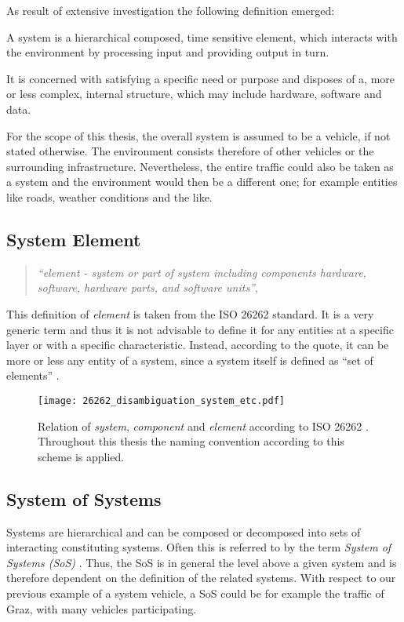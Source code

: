 As result of extensive investigation the following definition emerged:

\begin{myquote}
A system is a hierarchical composed, time sensitive element, which interacts with the environment by processing input and providing output in turn.

It is concerned with satisfying a specific need or purpose and disposes of a, more or less complex, internal structure, which may include hardware, software and data.
\end{myquote}

For the scope of this thesis, the overall system is assumed to be a vehicle, if not stated otherwise. The environment consists therefore of other vehicles or the surrounding infrastructure. Nevertheless, the entire traffic could also be taken as a system and the environment would then be a different one; for example entities like roads, weather conditions and the like.



\subsection{System Element}
\label{sec:system_element}
\begin{quote}
\emph{``element - system or part of system including components hardware, software, hardware parts, and software units''}, \cite{iso26262:1}
\end{quote}
This definition of \emph{element} is taken from the ISO 26262 standard. It is a very generic term and thus it is not advisable to define it for any entities at a specific layer or with a specific characteristic. Instead, according to the quote, it can be more or less any entity of a system, since a system itself is defined as ``set of elements'' \cite{iso26262:1}.

\begin{figure}[ht]
\centering
\texttt{[image: 26262\_disambiguation\_system\_etc.pdf]}

\caption{Relation of \emph{system}, \emph{component} and \emph{element} according to ISO 26262 \cite{iso26262:course1}. Throughout this thesis the naming convention according to this scheme is applied.}
\label{fig:26262_disambiguation}
\end{figure}


\subsection{System of Systems}
Systems are hierarchical and can be composed or decomposed into sets of interacting constituting systems. Often this is referred to by the term \emph{System of Systems (SoS)} \cite[p.7]{genesys}. Thus, the SoS is in general the level above a given system and is therefore dependent on the definition of the related systems. With respect to our previous example of a system vehicle, a SoS could be for example the traffic of Graz, with many vehicles participating.

